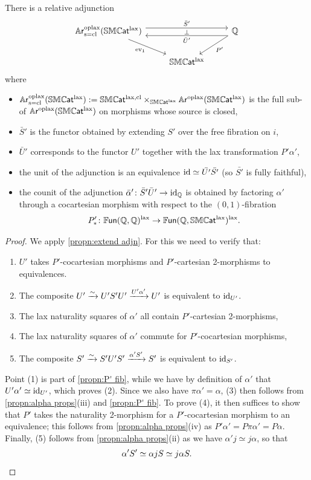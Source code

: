 \documentclass[a4paper,11pt]{article}
\begin{document}
\begin{thm}\label{thm:S' U' extend adjn}
  There is a relative adjunction
  \[
    \begin{tikzcd}
     \AR^{\oplax}_{\mathrm{s}=\cl}(\SMCATl) \ar[rr, yshift=4pt,
     "\bar{S}'"{above}, "\perp"{below}]
     \ar[dr, "\ev_{1}"'] & & \tQ \ar[dl, "P'"] \ar[ll,
     yshift=-5pt, "\bar{U}'"{below}] \\
      & \SMCATl
    \end{tikzcd}
  \]
  where
  \begin{itemize}
  \item $\mathbb{A}\mkern-0.5mu\textsf{\textup{r}}^{\text{\textup{oplax}}}_{\mathrm{s}=\text{\textup{cl}}}(\mathbb{SMC}\mkern-0.5mu\textsf{\textup{at}}^{\text{\textup{lax}}}) := \mathbb{SMC}\mkern-0.5mu\textsf{\textup{at}}^{\text{\textup{lax}},\text{\textup{cl}}}
    \times_{\mathbb{SMC}\mkern-0.5mu\textsf{\textup{at}}^{\text{\textup{lax}}}} \mathbb{A}\mkern-0.5mu\textsf{\textup{r}}^{\text{\textup{oplax}}}(\mathbb{SMC}\mkern-0.5mu\textsf{\textup{at}}^{\text{\textup{lax}}})$ is the full sub-\itcat{}
    of $\mathbb{A}\mkern-0.5mu\textsf{\textup{r}}^{\text{\textup{oplax}}}(\mathbb{SMC}\mkern-0.5mu\textsf{\textup{at}}^{\text{\textup{lax}}})$ on morphisms whose source is closed,
  \item   $\bar{S}'$ is the functor obtained by extending $S'$ over the
  free fibration on $i$,
\item  $\bar{U}'$ corresponds to the functor $U'$
  together with the lax transformation $P'\alpha'$, 
\item the unit of the adjunction is an equivalence $\text{\textup{id}} \simeq
  \bar{U'}\bar{S'}$ (so $\bar{S'}$ is fully faithful),
\item the counit of the adjunction $\bar{\alpha}' \colon \bar{S}'\bar{U}' \to \id_{\tQ}$ is
    obtained by factoring $\alpha'$ through a cocartesian morphism
    with respect to the $(0,1)$-fibration
    \[ P'_{*} \colon \FUN(\tQ,\tQ)^{\lax} \to \FUN(\tQ, \SMCATl)^{\lax}.\]
  \end{itemize}
\end{thm}
\begin{proof}
  We apply \cref{propn:extend adjn}. For this we need to verify that:
  \begin{enumerate}
  \item $U'$ takes $P'$-cocartesian morphisms and $P'$-cartesian
    2-morphisms to equivalences.
  \item The composite 
    $U' \isoto U'S'U' \xto{U' \alpha'} U'$ is equivalent to $\text{\textup{id}}_{U'}$.
  \item The lax naturality squares of $\alpha'$ all contain
    $P'$-cartesian 2-morphisms,
  \item The lax naturality squares of $\alpha'$ commute for
    $P'$-cocartesian morphisms,
  \item The composite $S' \isoto S'U'S' \xto{\alpha' S'} S'$
    is equivalent to $\text{\textup{id}}_{S'}$.
  \end{enumerate}

  Point (1) is part of \cref{propn:P' fib}, while we have by
  definition of $\alpha'$ that 
  $U'\alpha' \simeq \text{\textup{id}}_{U'}$, which proves (2). Since we also have
  $\pi \alpha' = \alpha$,  (3) then follows from
  \cref{propn:alpha props}(iii) and \cref{propn:P' fib}. To prove (4),
  it then suffices to show that $P'$ takes the naturality 2-morphism
  for a $P'$-cocartesian morphism to an equivalence; this follows from
  \cref{propn:alpha props}(iv) as
  $P'\alpha' = P \pi \alpha' = P \alpha$. Finally, (5) follows from 
  \cref{propn:alpha props}(ii) as we have $\alpha' j \simeq j \alpha$, so that
  \[ \alpha' S' \simeq \alpha j S \simeq j \alpha S. \qedhere \]
\end{proof}
\end{document}
